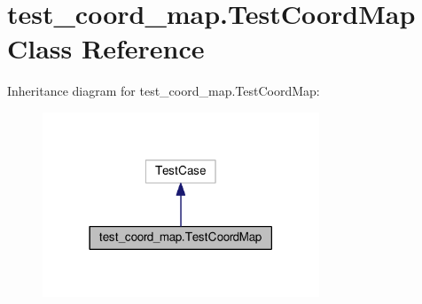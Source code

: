 \hypertarget{classtest__coord__map_1_1_test_coord_map}{}\section{test\+\_\+coord\+\_\+map.\+Test\+Coord\+Map Class Reference}
\label{classtest__coord__map_1_1_test_coord_map}


Inheritance diagram for test\+\_\+coord\+\_\+map.\+Test\+Coord\+Map\+:
\nopagebreak
\begin{figure}[H]
\begin{center}
\leavevmode
\includegraphics[width=234pt]{classtest__coord__map_1_1_test_coord_map__inherit__graph}
\end{center}
\end{figure}
